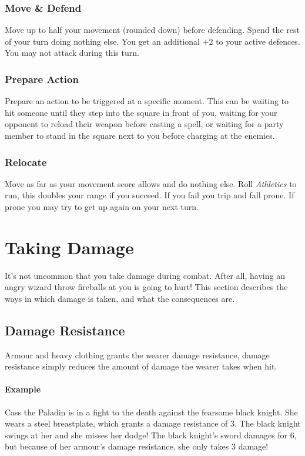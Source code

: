 \subsubsection{Move \& Defend}
Move up to half your movement (rounded down) before defending. 
Spend the rest of your turn doing nothing else. 
You get an additional $+2$ to your active defences. 
You may not attack during this turn.

\subsubsection{Prepare Action}
Prepare an action to be triggered at a specific moment.
This can be waiting to hit someone until they step into the square in front of you, waiting for your opponent to reload their weapon before casting a spell, or waiting for a party member to stand in the square next to you before charging at the enemies.

\subsubsection{Relocate}
Move as far as your movement score allows and do nothing else.
Roll \textit{Athletics} to run, this doubles your range if you succeed.
If you fail you trip and fall prone.
If prone you may try to get up again on your next turn.

\section{Taking Damage}
It's not uncommon that you take damage during combat.
After all, having an angry wizard throw fireballs at you is going to hurt!
This section describes the ways in which damage is taken, and what the consequences are.

\subsection{Damage Resistance}
Armour and heavy clothing grants the wearer damage resistance, damage resistance simply reduces the amount of damage the wearer takes when hit.

\paragraph{Example} Cass the Paladin is in a fight to the death against the fearsome black knight.
She wears a steel breastplate, which grants a damage resistance of 3.
The black knight swings at her and she misses her dodge!
The black knight's sword damages for 6, but because of her armour's damage resistance, she only takes 3 damage!

